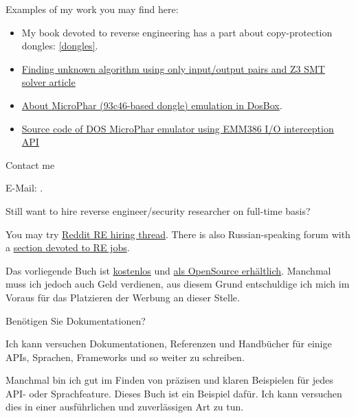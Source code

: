 Examples of my work you may find here:

\begin{itemize}
\item My book devoted to reverse engineering has a part about copy-protection dongles: \ref{dongles}.
\item \href{http://yurichev.com/writings/z3_rockey.pdf}{Finding unknown algorithm using only input/output pairs and Z3 SMT solver article}
\item \href{http://yurichev.com/blog/56/}{About MicroPhar (93c46-based dongle) emulation in DosBox}.
\item \href{http://conus.info/dongle/src/microph.asm}{Source code of DOS MicroPhar emulator using EMM386 I/O interception API}
\end{itemize}

\large Contact me \normalsize

E-Mail: \GTT{\EMAIL}.

\large Still want to hire reverse engineer/security researcher on full-time basis? \normalsize

You may try \href{https://www.reddit.com/r/ReverseEngineering/comments/49cza0/rreverseengineerings_2015_triannual_hiring_thread/}{Reddit RE hiring thread}.
There is also Russian-speaking forum with a \href{https://forum.reverse4you.org/forumdisplay.php?f=252}{section devoted to RE jobs}.

\fi %

\ifdefined\GERMAN

\bigskip
\bigskip
\bigskip

\huge
\normalsize

\bigskip
\bigskip
\bigskip

Das vorliegende Buch ist \href{http://beginners.re/}{kostenlos} und
\href{https://github.com/dennis714/RE-for-beginners/}{als OpenSource erhältlich}.
Manchmal muss ich jedoch auch Geld verdienen, aus diesem Grund entschuldige ich mich im Voraus
für das Platzieren der Werbung an dieser Stelle.

\iffalse
\Large Benötigen Sie Dokumentationen? \normalsize

Ich kann versuchen Dokumentationen, Referenzen und Handbücher für einige APIs,
Sprachen, Frameworks und so weiter zu schreiben.

Manchmal bin ich gut im Finden von präzisen und klaren Beispielen für jedes API- oder Sprachfeature.
Dieses Buch ist ein Beispiel dafür.
Ich kann versuchen dies in einer ausführlichen und zuverlässigen Art zu tun.

